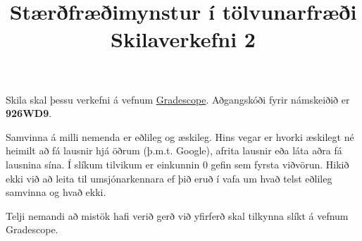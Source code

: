 \documentclass{exam}
\title{Stærðfræðimynstur í tölvunarfræði \\ Skilaverkefni 2}
\author{}
\begin{document}
\maketitle
\thispagestyle{empty} 

Skila skal þessu verkefni á vefnum \href{https://gradescope.com/}{Gradescope}. Aðgangskóði fyrir námskeiðið er \textbf{926WD9}.

Samvinna á milli nemenda er eðlileg og æskileg. Hins vegar er hvorki æskilegt né heimilt að fá lausnir hjá öðrum (þ.m.t. Google), afrita lausnir eða láta aðra fá lausnina sína. Í slíkum tilvikum er einkunnin 0 gefin sem fyrsta viðvörun. Hikið ekki við að leita til umsjónarkennara ef þið eruð í vafa um hvað telst eðlileg samvinna og hvað ekki.

Telji nemandi að mistök hafi verið gerð við yfirferð skal tilkynna slíkt á vefnum Gradescope.
\end{document}
